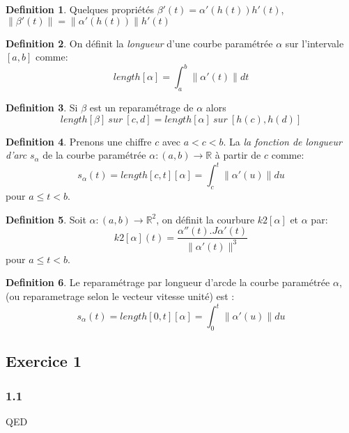 \documentclass[]{book}
\theoremstyle{definition}
\newtheorem{defn}{Definition}
\newcommand{\bb}[1]{\mathbb{#1}}
\newcommand{\R}{\bb{R}}
\begin{document}
 
\begin{defn}
Quelques propri\'et\'es $\beta'(t) = \alpha'(h(t))h'(t)$, $\lVert \beta'(t)\rVert = \lVert\alpha'(h(t))\rVert h'(t)$
\end{defn}
 

\begin{defn}
On d\'efinit la \emph{longueur} d'une courbe param\'etr\'ee $\alpha$ sur l'intervale $[a,b]$ comme:
$$length[\alpha] = \int_a^b \lVert \alpha'(t)\rVert dt$$
\end{defn}

\begin{defn}
Si $\beta$ est un reparam\'etrage de $\alpha$ alors
$$length[\beta] \ sur\ [c,d] = length[\alpha]  \ sur\ [h(c),h(d)]$$ 
\end{defn}
 

\begin{defn}
Prenons une chiffre $c$ avec $a < c < b$. La \emph{la fonction de longueur d'arc} $s_{\alpha}$ de la courbe param\'etr\'ee $\alpha:(a,b) \to \R$ \`a partir de $c$ comme:
$$
s_{\alpha}(t) = length[c,t][\alpha] = \int_c^t \lVert \alpha'(u) \rVert du
$$ 
pour $a \le t < b$.
\end{defn}
 
\begin{defn}
Soit $\alpha: (a,b) \to \R^2$, on d\'efinit la courbure $k2[\alpha]$ et $\alpha$ par:
$$
k2[\alpha](t) = \frac{\alpha''(t).J\alpha'(t)}{\lVert \alpha'(t) \rVert^3}
$$ 
pour $a \le t < b$.
\end{defn}


\begin{defn}
Le reparam\'etrage par longueur d'arcde la courbe param\'etr\'ee $\alpha$, (ou reparametrage selon le vecteur vitesse unit\'e) est :
$$
s_{\alpha}(t) = length[0,t][\alpha] = \int_0^t \lVert \alpha'(u) \rVert du
$$ 
\end{defn}


\subsection*{Exercice 1}

\subsubsection*{1.1}


QED
\end{document}
